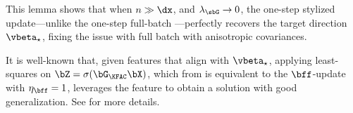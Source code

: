 This lemma shows that when $n \gg \dx$, and $\lambda_\sbG\to 0$,  the one-step stylized \KFAC  update---unlike the one-step full-batch \SGD ---perfectly 
recovers the target direction \(\vbeta_\star\), fixing the issue with full batch \SGD with anisotropic covariances.


\begin{remark}  It is well-known that, given features that align with $\vbeta_\star$, applying least-squares on $\bZ=\sigma(\bG_{\textup{\KFAC}}\bX)$, which from  is equivalent to the \KFAC $\bff$-update with $\eta_{\bff} = 1$, leverages the feature to obtain a solution with good generalization. See  for more details.
    
\end{remark}
